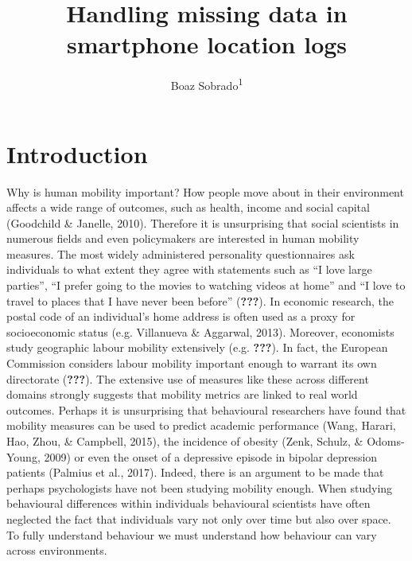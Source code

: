 \documentclass[man]{apa6}
\title{Handling missing data in smartphone location logs}
\author{Boaz Sobrado\textsuperscript{1}}
\affiliation{
    \vspace{0.5cm}
          \textsuperscript{1} Utrecht University  }
\theoremstyle{definition}
\theoremstyle{definition}
\theoremstyle{definition}
\theoremstyle{remark}
\begin{document}
\maketitle

\setcounter{secnumdepth}{0}



\section{Introduction}\label{introduction}

Why is human mobility important? How people move about in their
environment affects a wide range of outcomes, such as health, income and
social capital (Goodchild \& Janelle, 2010). Therefore it is
unsurprising that social scientists in numerous fields and even
policymakers are interested in human mobility measures. The most widely
administered personality questionnaires ask individuals to what extent
they agree with statements such as \enquote{I love large parties},
\enquote{I prefer going to the movies to watching videos at home} and
\enquote{I love to travel to places that I have never been before}
({\textbf{???}}). In economic research, the postal code of an
individual's home address is often used as a proxy for socioeconomic
status (e.g. Villanueva \& Aggarwal, 2013). Moreover, economists study
geographic labour mobility extensively (e.g. {\textbf{???}}). In fact,
the European Commission considers labour mobility important enough to
warrant its own directorate ({\textbf{???}}). The extensive use of
measures like these across different domains strongly suggests that
mobility metrics are linked to real world outcomes. Perhaps it is
unsurprising that behavioural researchers have found that mobility
measures can be used to predict academic performance (Wang, Harari, Hao,
Zhou, \& Campbell, 2015), the incidence of obesity (Zenk, Schulz, \&
Odoms-Young, 2009) or even the onset of a depressive episode in bipolar
depression patients (Palmius et al., 2017). Indeed, there is an argument
to be made that perhaps psychologists have not been studying mobility
enough. When studying behavioural differences within individuals
behavioural scientists have often neglected the fact that individuals
vary not only over time but also over space. To fully understand
behaviour we must understand how behaviour can vary across environments.
\end{document}
